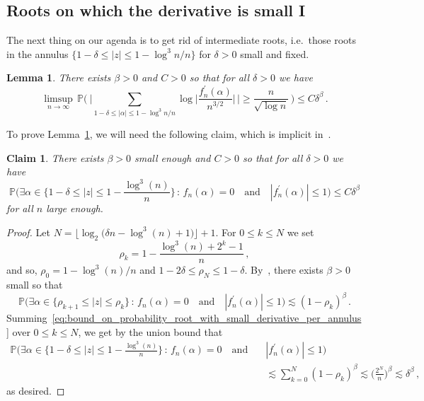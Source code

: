 \documentclass[11pt]{amsart}
\newtheorem{lemma}[theorem]{Lemma}
\newtheorem{claim}[theorem]{Claim}
\theoremstyle{remark}
\theoremstyle{definition}
\newcommand{\bP}{\mathbb P}
\begin{document}
    \subsection{Roots on which the derivative is small I}
    The next thing on our agenda is to get rid of intermediate roots, i.e.\ those roots in the annulus $\{ 1-\delta \le |z| \le 1-\log^3 n / n \}$ for $\delta>0$ small and fixed. 
    \begin{lemma}
        \label{lemma:sum_in_the_annulus_weak}
        There exists $\beta>0$ and $C>0$ so that for all $\delta>0$ we have
        \[
        \limsup_{n\to \infty} \, \bP\Bigg( \ \Bigg| \sum_{1-\delta\le |\alpha|\le 1-\log^3 n /n} \log \bigg|\frac{f_n^\prime(\alpha)}{n^{3/2}}\bigg|\, \Bigg| \ge \frac{n}{\sqrt{\log n}} \, \Bigg) \le C \delta^\beta \, .
        \]
    \end{lemma}
    To prove Lemma~\ref{lemma:sum_in_the_annulus_weak}, we will need the following claim, which is implicit in~\cite{Michelen-Yakir-root-separation}. 
    \begin{claim}\label{claim:no-small-deriv-weak}
        There exists $\beta>0$ small enough and $C>0$ so that for all $\delta>0$ we have 
        \[
        \bP\Big(\exists \alpha \in \Big\{1-\delta \le |z| \le 1 - \frac{\log^3(n)}{n} \Big\}  \, : \, f_n(\alpha)=0 \quad  \text{and} \quad |f_n^\prime(\alpha)|\le 1 \Big) \le C\delta^\beta
        \]
        for all $n$ large enough. 
    \end{claim}
    \begin{proof}
        Let $N = \lfloor \log_2\big(\delta n - \log^3(n) + 1\big) \rfloor + 1$. For $0\le k\le N$ we set
        \[
        \rho_{k} = 1-\frac{\log^3(n) + 2^k - 1 }{n} \, , 
        \]
        and so, $\rho_0 = 1-\log^3(n)/n$ and $1-2\delta\le \rho_N\le 1-\delta$. By~\cite[Lemma~4.3]{Michelen-Yakir-root-separation}, there exists $\beta>0$ small so that
        \begin{equation}
        \label{eq:bound_on_probability_root_with_small_derivative_per_annulus}
            \bP\Big(\exists \alpha \in \big\{\rho_{k+1} \le |z| \le \rho_k \big\}  \, : \, f_n(\alpha)=0 \quad  \text{and} \quad |f_n^\prime(\alpha)|\le 1 \Big) \lesssim (1-\rho_k)^{\beta} \, .
        \end{equation}
        Summing~\eqref{eq:bound_on_probability_root_with_small_derivative_per_annulus} over $0\le k\le N$, we get by the union bound that
        \begin{align*}
          \bP\Big(\exists \alpha \in \Big\{1-\delta \le |z| \le 1 - \frac{\log^3(n)}{n} \Big\}  \, : \, f_n(\alpha)=0 \quad  \text{and} \quad &|f_n^\prime(\alpha)|\le 1 \Big) \\ &\lesssim \sum_{k=0}^{N} (1-\rho_k)^\beta \lesssim \Big(\frac{2^N}{n}\Big)^\beta \lesssim \delta^\beta\, ,
        \end{align*}
        as desired.
    \end{proof}
    
\end{document}
